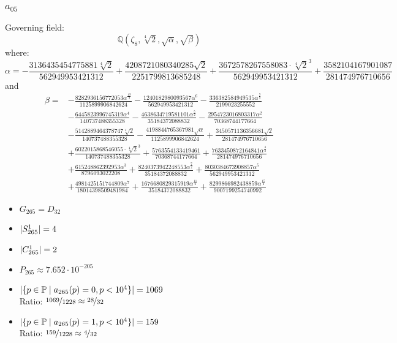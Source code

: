 \subsubsection{$a_{05}$}
Governing field:
$$\mathbb{Q}\left(\zeta_8, \sqrt[4]{2}, \sqrt{\alpha}, \sqrt{\beta}\right)$$
where:
$$\alpha = - \frac{3136435454775881 \sqrt[4]{2}}{562949953421312} + \frac{4208721080340285 \sqrt{2}}{2251799813685248} + \frac{3672578267558083 \cdot \sqrt[4]{2}^3}{562949953421312} + \frac{3582104167901087}{281474976710656}$$
and
\begin{align*}
\beta = 
&- \frac{8282936156772053 \alpha^{\frac{13}{2}}}{1125899906842624} 
- \frac{1240182980093567 \alpha^{6}}{562949953421312} 
- \frac{336382584949535 \alpha^{\frac{9}{2}}}{2199023255552} 
\\
&- \frac{6445823996745319 \alpha^{4}}{140737488355328} 
- \frac{4638634719581101 \alpha^{\frac{5}{2}}}{35184372088832} 
- \frac{2954723016803317 \alpha^{2}}{70368744177664} 
\\
&- \frac{5142889464378747 \sqrt[4]{2}}{140737488355328} 
- \frac{4198844765367981 \sqrt{\alpha}}{1125899906842624} 
+ \frac{3450571136356681 \sqrt{2}}{281474976710656} 
\\
&+ \frac{6022015868546055 \cdot \sqrt[4]{2}^3}{140737488355328} 
+ \frac{5763554133419461}{70368744177664} 
+ \frac{7633450872164841 \alpha^{\frac{3}{2}}}{281474976710656} 
\\
&+ \frac{615248862392953 \alpha^{3}}{8796093022208} 
+ \frac{8240373942248553 \alpha^{\frac{7}{2}}}{35184372088832} 
+ \frac{8030384673908857 \alpha^{5}}{562949953421312} 
\\
&+ \frac{4981425151744809 \alpha^{7}}{18014398509481984} 
+ \frac{1676680829315919 \alpha^{\frac{11}{2}}}{35184372088832} 
+ \frac{8299866982438859 \alpha^{\frac{15}{2}}}{9007199254740992}
\end{align*}
\begin{multicols}{2}
	\begin{itemize}
		\item $G_{265} = D_{32}$
		\item $| S_{265}^1 | = 4$
		\item $| C_{265}^1 | = 2$
		\item $P_{265} \approx 7.652 \cdot 10^{-205}$
	\end{itemize}
	\begin{itemize}
		\item $| \{ p \in \mathbb{P} \mid a_{265}(p)=0, p<10^4 \} | = 1069$\\
		Ratio: $\nicefrac{ 1069 }{ 1228 } \approx \nicefrac{ 28 }{ 32 }$
		\item $| \{ p \in \mathbb{P} \mid a_{265}(p)=1, p<10^4 \} | = 159$\\
		Ratio: $\nicefrac{ 159 }{ 1228 } \approx \nicefrac{ 4 }{ 32 }$
	\end{itemize}
\end{multicols}

